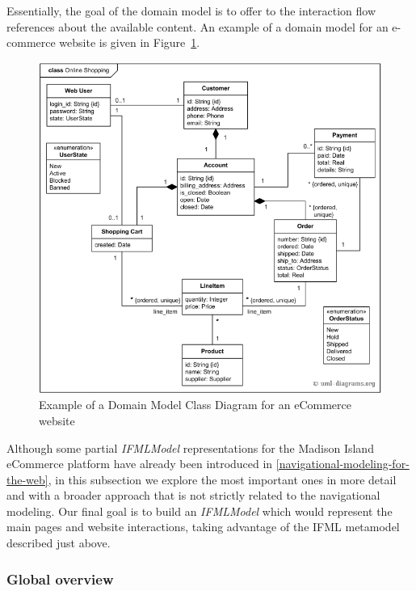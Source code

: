 Essentially, the goal of the domain model is to offer to the interaction flow references about the available content. An example of a domain model for an e-commerce website is given in Figure~\ref{fig:domain-model-uml-ecommerce}.

\vspace{0.5cm}
\begin{figure}[H]
  \centering
    \includegraphics[width=12cm]{images/diagrams/domain-model-uml-ecommerce.png}
  \caption{Example of a Domain Model Class Diagram for an eCommerce website}
  \label{fig:domain-model-uml-ecommerce}
\end{figure}
\vspace{0.5cm}

Although some partial \textit{IFMLModel} representations for the Madison Island eCommerce platform have already been introduced in \ref{navigational-modeling-for-the-web}, in this subsection we explore the most important ones in more detail and with a broader approach that is not strictly related to the navigational modeling. Our final goal is to build an \textit{IFMLModel} which would represent the main pages and website interactions, taking advantage of the IFML metamodel described just above.

\subsubsection{Global overview}

